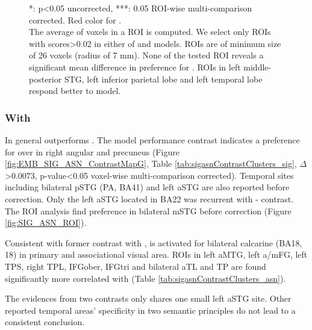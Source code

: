 \begin{figure}
    \centering
    \caption[- ROI Contrast, Group]{*: p<0.05 uncorrected, ***: 0.05 ROI-wise multi-comparison corrected. Red color for .\\ The average  of voxels in a ROI is computed. We select only ROIs with scores>0.02 in either of  and  models. ROIs are of minimum size of 26 voxels (radius of 7 mm). None of the tested ROI reveals a significant mean difference in preference for . ROIs in left middle-posterior STG, left inferior parietal lobe and left temporal lobe respond better to  model.} 
    \label{fig:SIM_ASN_ROI}
\end{figure}


\subsubsection{With }

In general  outperforms . The model performance contrast indicates a preference for  over  in right angular and precuneus (Figure \ref{fig:EMB_SIG_ASN_ContrastMapG}, Table \ref{tab:sigasnContrastClusters_sig}, \(\Delta\)>0.0073, p-value<0.05 voxel-wise multi-comparison corrected). Temporal sites including bilateral pSTG (PA, BA41) and left aSTG are also reported before correction. Only the left aSTG located in BA22 was recurrent with - contrast. The ROI analysis find  preference in bilateral mSTG before correction (Figure \ref{fig:SIG_ASN_ROI}).

Consistent with former contrast with ,  is activated for bilateral calcarine (BA18, 18) in primary and associational visual area. ROIs in left aMTG, left a/mFG, left TPS, right TPL, IFGober, IFGtri and bilateral aTL and TP are found significantly more correlated with  (Table \ref{tab:sigasnContrastClusters_asn}).

The evidences from two contrasts only shares one small left aSTG site. Other reported temporal areas' specificity in two semantic principles do not lead to a consistent conclusion.